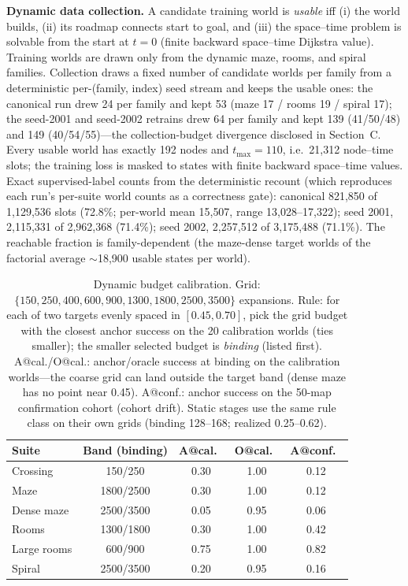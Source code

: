 \documentclass[letterpaper]{article} %
\begin{document}
\textbf{Dynamic data collection.} A candidate training world is \emph{usable} iff (i) the world builds, (ii) its roadmap connects start to goal, and (iii) the space--time problem is solvable from the start at $t{=}0$ (finite backward space--time Dijkstra value). Training worlds are drawn only from the dynamic maze, rooms, and spiral families. Collection draws a fixed number of candidate worlds per family from a deterministic per-(family, index) seed stream and keeps the usable ones: the canonical run drew 24 per family and kept 53 (maze 17 / rooms 19 / spiral 17); the seed-2001 and seed-2002 retrains drew 64 per family and kept 139 (41/50/48) and 149 (40/54/55)---the collection-budget divergence disclosed in Section~C. Every usable world has exactly 192 nodes and $t_{\max}{=}110$, i.e.\ 21{,}312 node--time slots; the training loss is masked to states with finite backward space--time values. Exact supervised-label counts from the deterministic recount (which reproduces each run's per-suite world counts as a correctness gate): canonical 821{,}850 of 1{,}129{,}536 slots (72.8\%; per-world mean 15{,}507, range 13{,}028--17{,}322); seed 2001, 2{,}115{,}331 of 2{,}962{,}368 (71.4\%); seed 2002, 2{,}257{,}512 of 3{,}175{,}488 (71.1\%). The reachable fraction is family-dependent (the maze-dense target worlds of the factorial average $\sim$18{,}900 usable states per world).

\begin{table}[t]
\centering
\small
\setlength{\tabcolsep}{2.6pt}
\begin{tabular}{@{}lcccc@{}}
\toprule
Suite & Band (binding) & A@cal.\ & O@cal.\ & A@conf.\ \\
\midrule
Crossing & 150/250 & 0.30 & 1.00 & 0.12 \\
Maze & 1800/2500 & 0.30 & 1.00 & 0.12 \\
Dense maze & 2500/3500 & 0.05 & 0.95 & 0.06 \\
Rooms & 1300/1800 & 0.30 & 1.00 & 0.42 \\
Large rooms & 600/900 & 0.75 & 1.00 & 0.82 \\
Spiral & 2500/3500 & 0.20 & 0.95 & 0.16 \\
\bottomrule
\end{tabular}
\caption{Dynamic budget calibration. Grid: $\{150, 250, 400, 600, 900, 1300, 1800, 2500, 3500\}$ expansions. Rule: for each of two targets evenly spaced in $[0.45, 0.70]$, pick the grid budget with the closest anchor success on the 20 calibration worlds (ties smaller); the smaller selected budget is \emph{binding} (listed first). A@cal./O@cal.: anchor/oracle success at binding on the calibration worlds---the coarse grid can land outside the target band (dense maze has no point near 0.45). A@conf.: anchor success on the 50-map confirmation cohort (cohort drift). Static stages use the same rule class on their own grids (binding 128--168; realized 0.25--0.62).}
\label{tab:calib}
\end{table}
\end{document}
